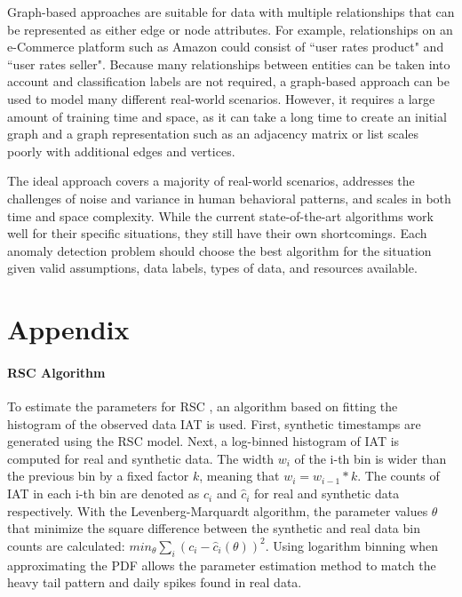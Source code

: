\documentclass[11pt, oneside]{article}   	%
\begin{document}
\quad Graph-based approaches are suitable for data with multiple relationships that can be represented as either edge or node attributes.
For example, relationships on an e-Commerce platform such as Amazon could consist of ``user rates product" and ``user rates seller".
Because many relationships between entities can be taken into account and classification labels are not required, a graph-based approach can be used to model many different real-world scenarios.
However, it requires a large amount of training time and space, as it can take a long time to create an initial graph and a graph representation such as an adjacency matrix or list scales poorly with additional edges and vertices.

\quad The ideal approach covers a majority of real-world scenarios, addresses the challenges of noise and variance in human behavioral patterns, and scales in both time and space complexity.
While the current state-of-the-art algorithms work well for their specific situations, they still have their own shortcomings. Each anomaly detection problem should choose the best algorithm for the situation given valid assumptions, data labels, types of data, and resources available.

\appendix
\section{Appendix}
\paragraph*{RSC Algorithm}
\quad

\quad To estimate the parameters for RSC \cite{rsc}, an algorithm based on fitting the histogram of the observed data IAT is used.
First, synthetic timestamps are generated using the RSC model.
Next, a log-binned histogram of IAT is computed for real and synthetic data.
The width $w_i$ of the i-th bin is wider than the previous bin by a fixed factor $k$, meaning that $w_i=w_{i-1}*k$.
The counts of IAT in each i-th bin are denoted as $c_i$ and $\hat{c}_i$ for real and synthetic data respectively.
With the Levenberg-Marquardt algorithm, the parameter values $\theta$ that minimize the square difference between the synthetic and real data bin counts are calculated: $min_{\theta} \sum_i (c_i - \hat{c}_i(\theta))^2$.
Using logarithm binning when approximating the PDF allows the parameter estimation method to match the heavy tail pattern and daily spikes found in real data.
\end{document}

